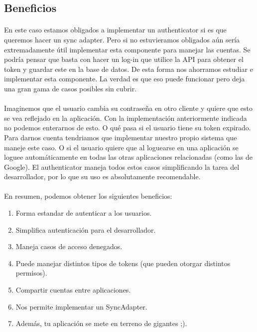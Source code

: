 \documentclass[10pt]{extarticle}
\begin{document}
\subsection{Beneficios}

\paragraph{}
En este caso estamos obligados a implementar un authenticator si es que queremos hacer un sync adapter. Pero si no estuvieramos obligados aún sería extremadamente útil implementar esta componente para manejar las cuentas. Se podría pensar que basta con hacer un log-in que utilice la API para obtener el token y guardar este en la base de datos. De esta forma nos ahorramos estudiar e implementar esta componente. La verdad es que eso puede funcionar pero deja una gran gama de casos posibles sin cubrir.

\paragraph{}
Imaginemos que el usuario cambia su contraseña en otro cliente y quiere que esto se vea reflejado en la aplicación. Con la implementación anteriormente indicada no podemos enterarnos de esto. O qué pasa si el usuario tiene su token expirado. Para darnos cuenta tendriamos que implementar nuestro propio sistema que maneje este caso. O si el usuario quiere que al loguearse en una aplicación se loguee automáticamente en todas las otras aplicaciones relacionadas (como las de Google). El authenticator maneja todos estos casos simplificando la tarea del desarrollador, por lo que su uso es absolutamente recomendable.

\paragraph{}
En resumen, podemos obtener los siguientes beneficios:

\begin{enumerate}
	\item Forma estandar de autenticar a los usuarios.
	\item Simplifica autenticación para el desarrollador.
	\item Maneja casos de acceso denegados.
	\item Puede manejar distintos tipos de tokens (que pueden otorgar distintos permisos).
	\item Compartir cuentas entre aplicaciones.
	\item Nos permite implementar un SyncAdapter.
	\item Además, tu aplicación se mete en terreno de gigantes ;).
\end{enumerate}
\end{document}
